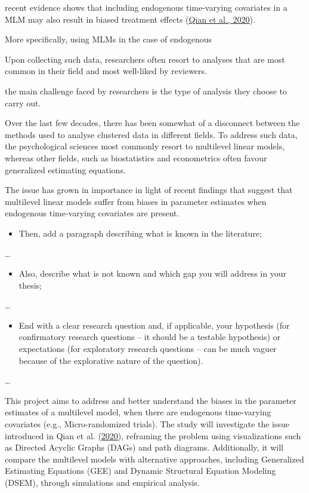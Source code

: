 \documentclass[
  12pt,
  a4paper,
]{article}
\providecommand{\tightlist}{%
  \setlength{\itemsep}{0pt}\setlength{\parskip}{0pt}}\usepackage{longtable,booktabs,array}
\begin{document}
recent evidence shows that including endogenous time-varying covariates
in a MLM may also result in biased treatment effects
(\protect\hyperlink{ref-qian2020}{Qian et al., 2020}).

More specifically, using MLMs in the case of endogenous

Upon collecting such data, researchers often resort to analyses that are
most common in their field and most well-liked by reviewers.

the main challenge faced by researchers is the type of analysis they
choose to carry out.

Over the last few decades, there has been somewhat of a disconnect
between the methods used to analyse clustered data in different fields.
To address such data, the psychological sciences most commonly resort to
multilevel linear models, whereas other fields, such as biostatistics
and econometrics often favour generalized estimating equations.

The issue has grown in importance in light of recent findings that
suggest that multilevel linear models suffer from biases in parameter
estimates when endogenous time-varying covariates are present.

\begin{itemize}
\tightlist
\item
  Then, add a paragraph describing what is known in the literature;
\end{itemize}

\ldots{}

\begin{itemize}
\tightlist
\item
  Also, describe what is not known and which gap you will address in
  your thesis;
\end{itemize}

\ldots{}

\begin{itemize}
\tightlist
\item
  End with a clear research question and, if applicable, your hypothesis
  (for confirmatory research questions -- it should be a testable
  hypothesis) or expectations (for exploratory research questions -- can
  be much vaguer because of the explorative nature of the question).
\end{itemize}

\ldots{}

This project aims to address and better understand the biases in the
parameter estimates of a multilevel model, when there are endogenous
time-varying covariates (e.g., Micro-randomized trials). The study will
investigate the issue introduced in Qian et al.
(\protect\hyperlink{ref-qian2020}{2020}), reframing the problem using
visualizations such as Directed Acyclic Graphs (DAGs) and path diagrams.
Additionally, it will compare the multilevel models with alternative
approaches, including Generalized Estimating Equations (GEE) and Dynamic
Structural Equation Modeling (DSEM), through simulations and empirical
analysis.
\end{document}
